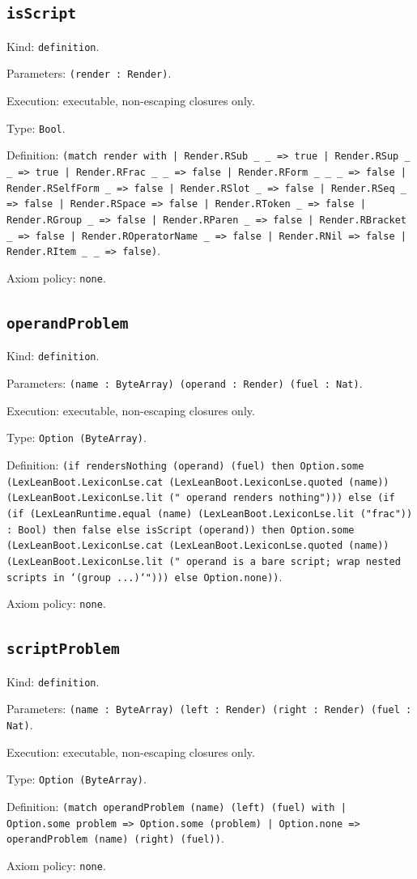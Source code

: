 \documentclass[11pt]{article}
\begin{document}
\subsection*{\texttt{isScript}}
\noindent Kind: \texttt{definition}.\par
\noindent Parameters: \texttt{(render : Render)}.\par
\noindent Execution: executable, non-escaping closures only.\par
\noindent Type: \texttt{Bool}.\par
\noindent Definition: \texttt{(match render with | Render.RSub \_ \_ => true | Render.RSup \_ \_ => true | Render.RFrac \_ \_ => false | Render.RForm \_ \_ \_ => false | Render.RSelfForm \_ => false | Render.RSlot \_ => false | Render.RSeq \_ => false | Render.RSpace => false | Render.RToken \_ => false | Render.RGroup \_ => false | Render.RParen \_ => false | Render.RBracket \_ => false | Render.ROperatorName \_ => false | Render.RNil => false | Render.RItem \_ \_ => false)}.\par
\noindent Axiom policy: \texttt{none}.\par
\subsection*{\texttt{operandProblem}}
\noindent Kind: \texttt{definition}.\par
\noindent Parameters: \texttt{(name : ByteArray) (operand : Render) (fuel : Nat)}.\par
\noindent Execution: executable, non-escaping closures only.\par
\noindent Type: \texttt{Option (ByteArray)}.\par
\noindent Definition: \texttt{(if rendersNothing (operand) (fuel) then Option.some (LexLeanBoot.LexiconLse.cat (LexLeanBoot.LexiconLse.quoted (name)) (LexLeanBoot.LexiconLse.lit (" operand renders nothing"))) else (if (if (LexLeanRuntime.equal (name) (LexLeanBoot.LexiconLse.lit ("frac")) : Bool) then false else isScript (operand)) then Option.some (LexLeanBoot.LexiconLse.cat (LexLeanBoot.LexiconLse.quoted (name)) (LexLeanBoot.LexiconLse.lit (" operand is a bare script; wrap nested scripts in `(group ...)`"))) else Option.none))}.\par
\noindent Axiom policy: \texttt{none}.\par
\subsection*{\texttt{scriptProblem}}
\noindent Kind: \texttt{definition}.\par
\noindent Parameters: \texttt{(name : ByteArray) (left : Render) (right : Render) (fuel : Nat)}.\par
\noindent Execution: executable, non-escaping closures only.\par
\noindent Type: \texttt{Option (ByteArray)}.\par
\noindent Definition: \texttt{(match operandProblem (name) (left) (fuel) with | Option.some problem => Option.some (problem) | Option.none => operandProblem (name) (right) (fuel))}.\par
\noindent Axiom policy: \texttt{none}.\par
\end{document}
